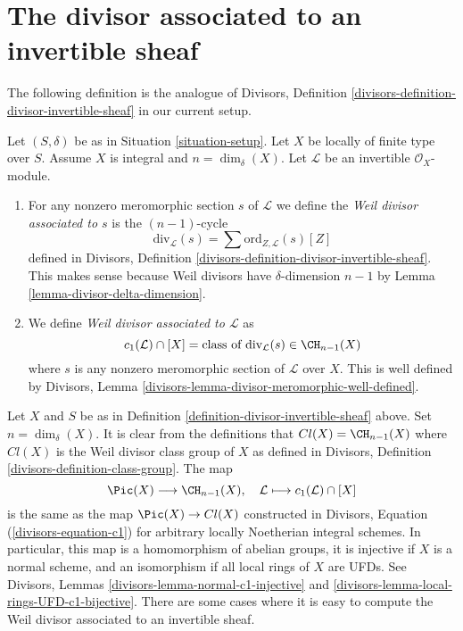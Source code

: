 \section{The divisor associated to an invertible sheaf}
\label{section-divisor-invertible-sheaf}

\noindent
The following definition is the analogue of
Divisors, Definition \ref{divisors-definition-divisor-invertible-sheaf}
in our current setup.

\begin{definition}
\label{definition-divisor-invertible-sheaf}
Let $(S, \delta)$ be as in Situation \ref{situation-setup}.
Let $X$ be locally of finite type over $S$. Assume $X$ is
integral and $n = \dim_\delta(X)$.
Let $\mathcal{L}$ be an invertible $\mathcal{O}_X$-module.
\begin{enumerate}
\item For any nonzero meromorphic section $s$ of $\mathcal{L}$
we define the {\it Weil divisor associated to $s$} is the
$(n - 1)$-cycle
$$
\text{div}_\mathcal{L}(s) =
\sum \text{ord}_{Z, \mathcal{L}}(s) [Z]
$$
defined in Divisors, Definition
\ref{divisors-definition-divisor-invertible-sheaf}.
This makes sense because Weil divisors have $\delta$-dimension $n - 1$
by Lemma \ref{lemma-divisor-delta-dimension}.
\item We define {\it Weil divisor associated to $\mathcal{L}$} as
$$
c_1(\mathcal{L}) \cap [X] =
\text{class of }\text{div}_\mathcal{L}(s) \in \CH_{n - 1}(X)
$$
where $s$ is any nonzero meromorphic section of $\mathcal{L}$ over
$X$. This is well defined by
Divisors, Lemma \ref{divisors-lemma-divisor-meromorphic-well-defined}.
\end{enumerate}
\end{definition}

\noindent
Let $X$ and $S$ be as in Definition \ref{definition-divisor-invertible-sheaf}
above. Set $n = \dim_\delta(X)$. It is clear from the definitions that
$Cl(X) = \CH_{n - 1}(X)$ where $Cl(X)$ is the Weil divisor class group of $X$
as defined in Divisors, Definition \ref{divisors-definition-class-group}.
The map
$$
\Pic(X) \longrightarrow \CH_{n - 1}(X), \quad
\mathcal{L} \longmapsto c_1(\mathcal{L}) \cap [X]
$$
is the same as the map $\Pic(X) \to Cl(X)$ constructed in
Divisors, Equation (\ref{divisors-equation-c1}) for arbitrary
locally Noetherian integral schemes. In particular, this map
is a homomorphism of abelian groups, it is injective if $X$ is
a normal scheme, and an isomorphism if all local rings of $X$
are UFDs. See Divisors, Lemmas \ref{divisors-lemma-normal-c1-injective} and
\ref{divisors-lemma-local-rings-UFD-c1-bijective}.
There are some cases where it is easy to compute the
Weil divisor associated to an invertible sheaf.


